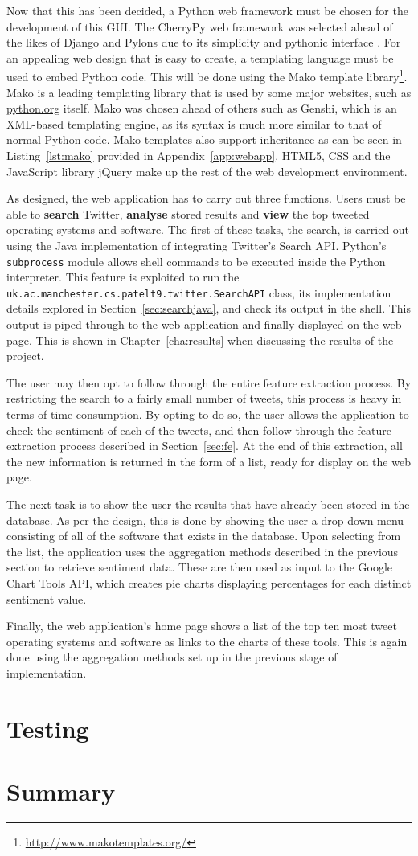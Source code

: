 Now that this has been decided, a Python web framework must be chosen for the development of this GUI. The CherryPy web framework was selected ahead of the likes of Django and Pylons due to its simplicity and pythonic interface \cite{cherrypy}. For an appealing web design that is easy to create, a templating language must be used to embed Python code. This will be done using the Mako template library\footnote{\url{http://www.makotemplates.org/}}. Mako is a leading templating library that is used by some major websites, such as \url{python.org} itself. Mako was chosen ahead of others such as Genshi, which is an XML-based templating engine, as its syntax is much more similar to that of normal Python code. Mako templates also support inheritance as can be seen in Listing~\ref{lst:mako} provided in Appendix~\ref{app:webapp}. HTML5, CSS and the JavaScript library jQuery make up the rest of the web development environment.

As designed, the web application has to carry out three functions. Users must be able to \textbf{search} Twitter, \textbf{analyse} stored results and \textbf{view} the top tweeted operating systems and software. The first of these tasks, the search, is carried out using the Java implementation of integrating Twitter's Search API. Python's \texttt{subprocess} module allows shell commands to be executed inside the Python interpreter. This feature is exploited to run the \\\texttt{uk.ac.manchester.cs.patelt9.twitter.SearchAPI} class, its implementation details explored in Section~\ref{sec:searchjava}, and check its output in the shell. This output is piped through to the web application and finally displayed on the web page. This is shown in Chapter~\ref{cha:results} when discussing the results of the project.

The user may then opt to follow through the entire feature extraction process. By restricting the search to a fairly small number of tweets, this process is heavy in terms of time consumption. By opting to do so, the user allows the application to check the sentiment of each of the tweets, and then follow through the feature extraction process described in Section~\ref{sec:fe}. At the end of this extraction, all the new information is returned in the form of a list, ready for display on the web page.

The next task is to show the user the results that have already been stored in the database. As per the design, this is done by showing the user a drop down menu consisting of all of the software that exists in the database. Upon selecting from the list, the application uses the aggregation methods described in the previous section to retrieve sentiment data. These are then used as input to the Google Chart Tools API, which creates pie charts displaying percentages for each distinct sentiment value.

Finally, the web application's home page shows a list of the top ten most tweet operating systems and software as links to the charts of these tools. This is again done using the aggregation methods set up in the previous stage of implementation.

\section{Testing}

\section{Summary}

